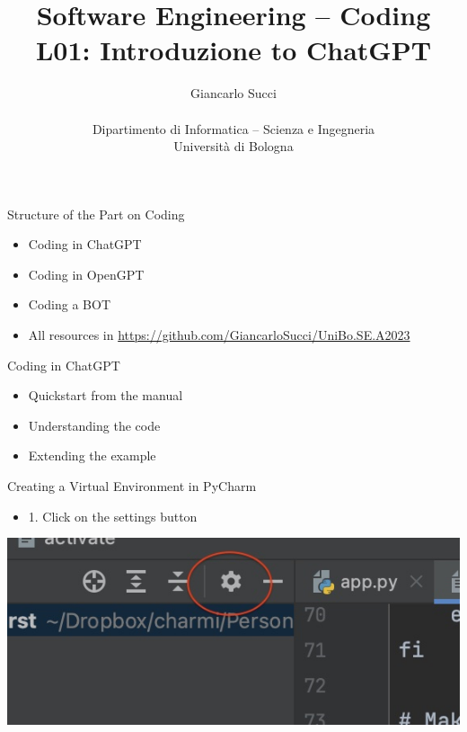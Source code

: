 \documentclass{beamer}
\title[L01]{Software Engineering -- Coding\newline\newline
 L01: Introduzione to ChatGPT} %
\author[{\tiny Giancarlo Succi }]{Giancarlo Succi\\\\ Dipartimento di Informatica -- Scienza e Ingegneria\\Universit\`{a} di Bologna\\
\bftt{g.succi@unibo.it}
} %
\institute[unibo] %
\date{} %
\begin{document}
\begin{frame}
\titlepage %

\end{frame}




\begin{frame}
{\centerline{Structure of the Part on Coding}}
\begin{itemize}
    \item Coding in ChatGPT
    \item Coding in OpenGPT
    \item Coding a BOT
    \item All resources in  \url{https://github.com/GiancarloSucci/UniBo.SE.A2023}
\end{itemize} 
\end{frame}

\begin{frame}
{\centerline{Coding in ChatGPT}}
\begin{itemize}
    \item Quickstart from the manual
    \item Understanding the code
    \item Extending the example
\end{itemize} 
\end{frame}

\begin{frame}
{\centerline{Creating a Virtual Environment in PyCharm}}
\begin{itemize}
    \item 1. Click on the settings button
\end{itemize} 
\begin{center}
    \includegraphics[width=\textwidth]{Coding/PyCharm.Settings.jpg}
\end{center}
\end{frame}
\end{document}
